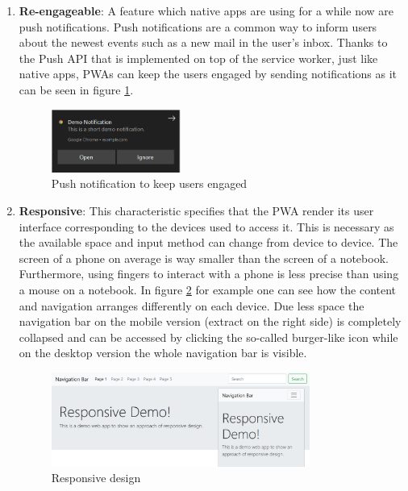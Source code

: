 \begin{enumerate}
	\item \textbf{Re-engageable}: A feature which native apps are using for a while now are push notifications. Push notifications are a common way to inform users about the newest events such as a new mail in the user’s inbox. Thanks to the Push API that is implemented on top of the service worker, just like native apps, PWAs can keep the users engaged by sending notifications as it can be seen in figure \ref{fig:pwa_reengageable}. \cite[p. 201]{hajianProgressiveWebApps2019}

\begin{figure}[htbp] 
	\centering
	\includegraphics[width=0.4\textwidth]{Assets/chapter_pwa/demonotification.PNG}
	\caption{Push notification to keep users engaged}
	\label{fig:pwa_reengageable}
\end{figure}

	\item \textbf{Responsive}: This characteristic specifies that the PWA render its user interface corresponding to the devices used to access it. This is necessary as the available space and input method can change from device to device. The screen of a phone on average is way smaller than the screen of a notebook. Furthermore, using fingers to interact with a phone is less precise than using a mouse on a notebook. \cite[pp. 115-116]{liebelProgressiveWebApps2019} In figure \ref{fig:pwa_responsive} for example one can see how the content and navigation arranges differently on each device. Due less space the navigation bar on the mobile version (extract on the right side) is completely collapsed and can be accessed by clicking the so-called burger-like icon while on the desktop version the whole navigation bar is visible.

\begin{figure}[htbp] 
	\centering
	\includegraphics[width=0.8\textwidth]{Assets/chapter_pwa/responsive-overall.jpg}
	\caption{Responsive design}
	\label{fig:pwa_responsive}
\end{figure}


\end{enumerate}
